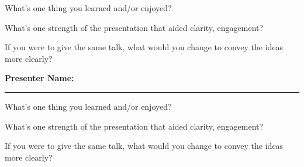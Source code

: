 \documentclass[11pt]{article}
\begin{document}
\bigskip
\noindent
What's one thing you learned and/or enjoyed?

\vspace{0.75in}

\noindent
What's one strength of the presentation that aided clarity, engagement?

\vspace{0.75in}

\noindent
If you were to give the same talk, what would you change to convey the ideas more clearly?

\pagebreak
\noindent
\textbf{Presenter Name:} \rule{10cm}{1pt}

\bigskip
\noindent
What's one thing you learned and/or enjoyed?

\vspace{0.75in}

\noindent
What's one strength of the presentation that aided clarity, engagement?

\vspace{0.75in}

\noindent
If you were to give the same talk, what would you change to convey the ideas more clearly?

\vspace{0.75in}
\end{document}
